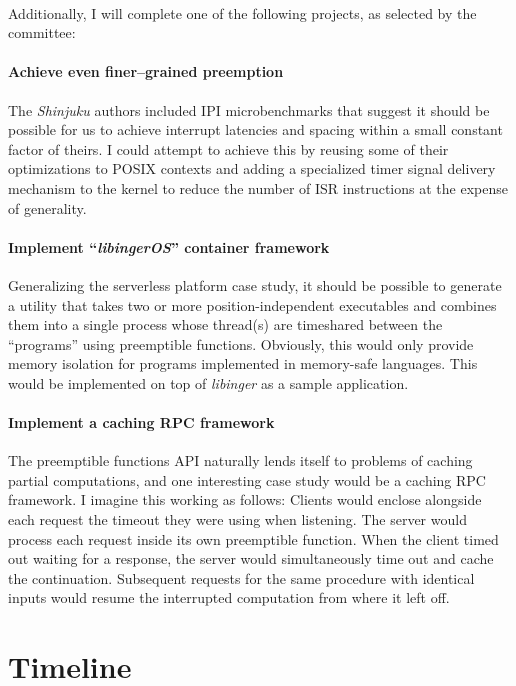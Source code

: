 \documentclass[12pt,letterpaper]{book}
\begin{document}
\hfill \\
\noindent
Additionally, I will complete one of the following projects, as selected by the
committee:

\paragraph{Achieve even finer--grained preemption}
The \textit{Shinjuku} authors included IPI microbenchmarks that suggest it should be
possible for us to achieve interrupt latencies and spacing within a small constant
factor of theirs.  I could attempt to achieve this by reusing some of their
optimizations to POSIX contexts and adding a specialized timer signal delivery
mechanism to the kernel to reduce the number of ISR instructions at the expense of
generality.

\paragraph{Implement ``\textit{libingerOS}'' container framework}
Generalizing the serverless platform case study, it should be possible to generate a
utility that takes two or more position-independent executables and combines them
into a single process whose thread(s) are timeshared between the ``programs'' using
preemptible functions.  Obviously, this would only provide memory isolation for
programs implemented in memory-safe languages.  This would be implemented on top of
\textit{libinger} as a sample application.

\paragraph{Implement a caching RPC framework}
The preemptible functions API naturally lends itself to problems of caching partial
computations, and one interesting case study would be a caching RPC framework.  I
imagine this working as follows:  Clients would enclose alongside each request the
timeout they were using when listening.  The server would process each request inside
its own preemptible function.  When the client timed out waiting for a response, the
server would simultaneously time out and cache the continuation.  Subsequent requests
for the same procedure with identical inputs would resume the interrupted computation
from where it left off.


\section{Timeline}
\end{document}
